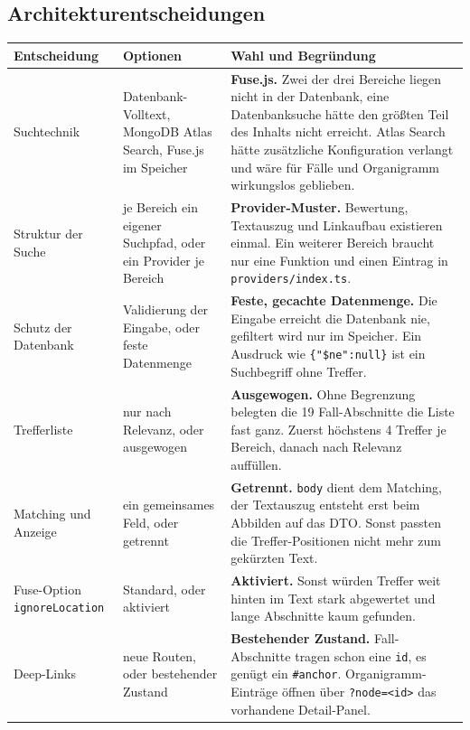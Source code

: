 \documentclass[11pt,a4paper]{article}
\let\oldsubsection\subsection
\renewcommand{\subsection}{\needspace{6\baselineskip}\oldsubsection}
\begin{document}
\subsection{Architekturentscheidungen}
\small
\begin{longtable}{@{}>{\raggedright\arraybackslash}p{3cm} >{\raggedright\arraybackslash}p{4.2cm} >{\raggedright\arraybackslash}p{7.6cm}@{}}
\toprule
\textbf{Entscheidung} & \textbf{Optionen} & \textbf{Wahl und Begründung} \\
\midrule
\endhead
Suchtechnik & Datenbank-Volltext, MongoDB Atlas Search, Fuse.js im Speicher & \textbf{Fuse.js.} Zwei der drei Bereiche liegen nicht in der Datenbank, eine Datenbanksuche hätte den größten Teil des Inhalts nicht erreicht. Atlas Search hätte zusätzliche Konfiguration verlangt und wäre für Fälle und Organigramm wirkungslos geblieben. \\
\midrule
Struktur der Suche & je Bereich ein eigener Suchpfad, oder ein Provider je Bereich & \textbf{Provider-Muster.} Bewertung, Textauszug und Linkaufbau existieren einmal. Ein weiterer Bereich braucht nur eine Funktion und einen Eintrag in \texttt{providers/index.ts}. \\
\midrule
Schutz der Datenbank & Validierung der Eingabe, oder feste Datenmenge & \textbf{Feste, gecachte Datenmenge.} Die Eingabe erreicht die Datenbank nie, gefiltert wird nur im Speicher. Ein Ausdruck wie \texttt{\{"\$ne":null\}} ist ein Suchbegriff ohne Treffer. \\
\midrule
Trefferliste & nur nach Relevanz, oder ausgewogen & \textbf{Ausgewogen.} Ohne Begrenzung belegten die 19 Fall-Abschnitte die Liste fast ganz. Zuerst höchstens 4 Treffer je Bereich, danach nach Relevanz auffüllen. \\
\midrule
Matching und Anzeige & ein gemeinsames Feld, oder getrennt & \textbf{Getrennt.} \texttt{body} dient dem Matching, der Textauszug entsteht erst beim Abbilden auf das DTO. Sonst passten die Treffer-Positionen nicht mehr zum gekürzten Text. \\
\midrule
Fuse-Option \texttt{ignoreLocation} & Standard, oder aktiviert & \textbf{Aktiviert.} Sonst würden Treffer weit hinten im Text stark abgewertet und lange Abschnitte kaum gefunden. \\
\midrule
Deep-Links & neue Routen, oder bestehender Zustand & \textbf{Bestehender Zustand.} Fall-Abschnitte tragen schon eine \texttt{id}, es genügt ein \texttt{\#anchor}. Organigramm-Einträge öffnen über \texttt{?node=<id>} das vorhandene Detail-Panel. \\

\end{longtable}
\end{document}
